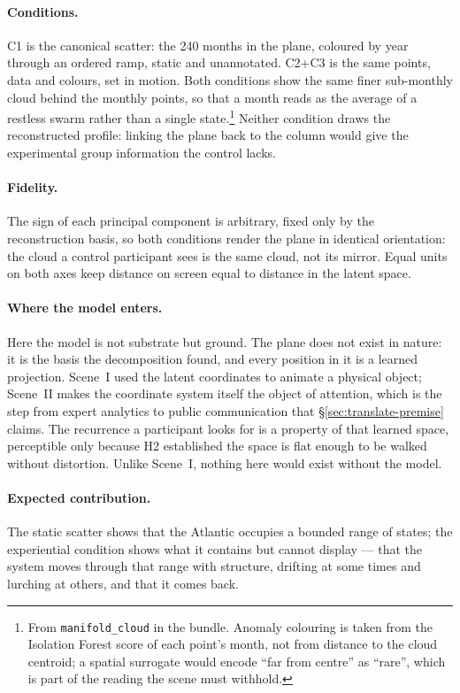 \paragraph{Conditions.} C1 is the canonical scatter: the 240 months in the plane, coloured by year through an ordered ramp, static and unannotated. C2+C3 is the same points, data and colours, set in motion. Both conditions show the same finer sub-monthly cloud behind the monthly points, so that a month reads as the average of a restless swarm rather than a single state.\footnote{From \texttt{manifold\_cloud} in the bundle. Anomaly colouring is taken from the Isolation Forest score of each point's month, not from distance to the cloud centroid; a spatial surrogate would encode ``far from centre'' as ``rare'', which is part of the reading the scene must withhold.} Neither condition draws the reconstructed profile: linking the plane back to the column would give the experimental group information the control lacks.

\paragraph{Fidelity.} The sign of each principal component is arbitrary, fixed only by the reconstruction basis, so both conditions render the plane in identical orientation: the cloud a control participant sees is the same cloud, not its mirror. Equal units on both axes keep distance on screen equal to distance in the latent space.

\paragraph{Where the model enters.} Here the model is not substrate but ground. The plane does not exist in nature: it is the basis the decomposition found, and every position in it is a learned projection. Scene~I used the latent coordinates to animate a physical object; Scene~II makes the coordinate system itself the object of attention, which is the step from expert analytics to public communication that \S\ref{sec:translate-premise} claims. The recurrence a participant looks for is a property of that learned space, perceptible only because H2 established the space is flat enough to be walked without distortion. Unlike Scene~I, nothing here would exist without the model.

\paragraph{Expected contribution.} The static scatter shows that the Atlantic occupies a bounded range of states; the experiential condition shows what it contains but cannot display --- that the system moves through that range with structure, drifting at some times and lurching at others, and that it comes back.

